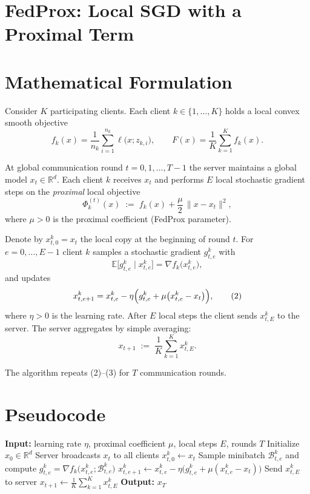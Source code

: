 \documentclass{article}
\newcommand{\EE}{\mathbb{E}}
\newcommand{\prox}{\mu}
\newcommand{\sgd}{\mathrm{SGD}}
\begin{document}
\section*{FedProx: Local SGD with a Proximal Term}

\section*{Mathematical Formulation}
Consider $K$ participating clients.  
Each client $k\in\{1,\dots ,K\}$ holds a local convex smooth objective
\[
f_k(x)=\frac{1}{n_k}\sum_{i=1}^{n_k}\ell\!\bigl(x;z_{k,i}\bigr),
\qquad 
F(x)=\frac{1}{K}\sum_{k=1}^{K}f_k(x).
\]

At global communication round $t=0,1,\dots ,T-1$ the server maintains a
global model $x_t\in\mathbb{R}^d$.  
Each client $k$ receives $x_t$ and performs $E$ local stochastic gradient
steps on the \emph{proximal} local objective
\[
\Phi_k^{(t)}(x)\;:=\;f_k(x)+\frac{\prox}{2}\,\|x-x_t\|^{2},
\tag{1}
\]
where $\prox>0$ is the proximal coefficient (FedProx parameter).

Denote by $x_{t,0}^{k}=x_t$ the local copy at the beginning of round $t$.
For $e=0,\dots ,E-1$ client $k$ samples a stochastic gradient $g_{t,e}^{k}$
with
\[
\EE\!\bigl[g_{t,e}^{k}\mid x_{t,e}^{k}\bigr]=\nabla f_k\!\bigl(x_{t,e}^{k}\bigr),
\]
and updates
\[
x_{t,e+1}^{k}
=
x_{t,e}^{k}
-\eta\Bigl(g_{t,e}^{k}+\prox\bigl(x_{t,e}^{k}-x_t\bigr)\Bigr),
\tag{2}
\]
where $\eta>0$ is the learning rate.  
After $E$ local steps the client sends $x_{t,E}^{k}$ to the server.
The server aggregates by simple averaging:
\[
x_{t+1}\;:=\;\frac{1}{K}\sum_{k=1}^{K}x_{t,E}^{k}.
\tag{3}
\]

The algorithm repeats (2)–(3) for $T$ communication rounds.

\section*{Pseudocode}
\begin{algorithm}[H]
\caption{FedProx}
\begin{algorithmic}[1]
\State \textbf{Input:} learning rate $\eta$, proximal coefficient $\prox$, local steps $E$, rounds $T$
\State Initialize $x_0\in\mathbb{R}^d$
    \State Server broadcasts $x_t$ to all clients
        \State $x_{t,0}^{k}\gets x_t$
            \State Sample minibatch $\mathcal{B}_{t,e}^{k}$ and compute 
            $g_{t,e}^{k}= \nabla f_k\!\bigl(x_{t,e}^{k};\mathcal{B}_{t,e}^{k}\bigr)$
            \State $x_{t,e+1}^{k}\gets x_{t,e}^{k}
                -\eta\bigl(g_{t,e}^{k}+\prox (x_{t,e}^{k}-x_t)\bigr)$   \Comment{local \sgd~with proximal term}
        \EndFor
        \State Send $x_{t,E}^{k}$ to server
    \EndFor
    \State $x_{t+1}\gets\frac{1}{K}\sum_{k=1}^{K}x_{t,E}^{k}$ 
\EndFor
\State \textbf{Output:} $x_T$
\end{algorithmic}
\end{algorithm}
\end{document}
